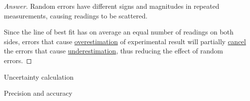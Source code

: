 \begin{proof}[Answer]
Random errors have different signs and magnitudes in repeated measurements, causing readings to be scattered.

Since the line of best fit has on average an equal number of readings on both sides, errors that cause \underline{overestimation} of experimental result will partially \underline{cancel} the errors that cause \underline{underestimation}, thus reducing the effect of random errors.
\end{proof}

\begin{prbm}
Uncertainty calculation
\end{prbm}

\begin{prbm}
Precision and accuracy
\end{prbm}
\pagebreak